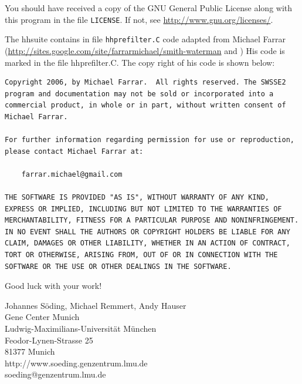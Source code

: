 \documentclass[11pt,a4paper]{article}
\begin{document}
You should have received a copy of the GNU General Public License
along with this program in the file \verb`LICENSE`.  
If not, see \url{http://www.gnu.org/licenses/}.

The hhsuite contains in file \verb`hhprefilter.C` code adapted from Michael 
Farrar (\url{http://sites.google.com/site/farrarmichael/smith-waterman}
and \cite{Farrar:2007}) His code is marked in the file hhprefilter.C. 
The copy right of his code is shown below:

\begin{verbatim}
Copyright 2006, by Michael Farrar.  All rights reserved. The SWSSE2
program and documentation may not be sold or incorporated into a
commercial product, in whole or in part, without written consent of
Michael Farrar.

For further information regarding permission for use or reproduction, 
please contact Michael Farrar at:

    farrar.michael@gmail.com

THE SOFTWARE IS PROVIDED "AS IS", WITHOUT WARRANTY OF ANY KIND, 
EXPRESS OR IMPLIED, INCLUDING BUT NOT LIMITED TO THE WARRANTIES OF 
MERCHANTABILITY, FITNESS FOR A PARTICULAR PURPOSE AND NONINFRINGEMENT. 
IN NO EVENT SHALL THE AUTHORS OR COPYRIGHT HOLDERS BE LIABLE FOR ANY 
CLAIM, DAMAGES OR OTHER LIABILITY, WHETHER IN AN ACTION OF CONTRACT, 
TORT OR OTHERWISE, ARISING FROM, OUT OF OR IN CONNECTION WITH THE 
SOFTWARE OR THE USE OR OTHER DEALINGS IN THE SOFTWARE.
\end{verbatim}

%


 
\vspace{20mm}
\begin{center}
Good luck with your work!

\vspace{5mm}
Johannes S\"oding, Michael Remmert, Andy Hauser\\[2mm]
Gene Center Munich\\
Ludwig-Maximilians-Universit\"at M\"unchen\\
Feodor-Lynen-Strasse 25\\
81377 Munich\\
http://www.soeding.genzentrum.lmu.de\\
soeding@genzentrum.lmu.de
\end{center}
\end{document}
